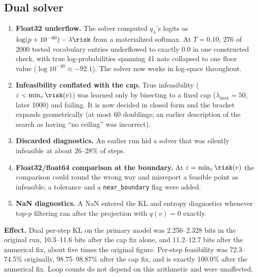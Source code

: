 \subsection*{Dual solver}
\begin{enumerate}[leftmargin=*]
  \item \textbf{Float32 underflow.} The solver computed $q_\lambda$'s logits as $\log(p+10^{-40})-\lambda\risk$ from a materialized softmax. At $T{=}0.10$, 276 of 2000 tested vocabulary entries underflowed to exactly $0.0$ in one constructed check, with true log-probabilities spanning 41 nats collapsed to one floor value ($\log10^{-40}\approx-92.1$). The solver now works in log-space throughout.
  \item \textbf{Infeasibility conflated with the cap.} True infeasibility ($\varepsilon<\min_v\risk(v)$) was learned only by bisecting to a fixed cap ($\lambda_{\max}{=}50$, later 1000) and failing. It is now decided in closed form and the bracket expands geometrically (at most 60 doublings; an earlier description of the search as having ``no ceiling'' was incorrect).
  \item \textbf{Discarded diagnostics.} An earlier run hid a solver that was silently infeasible at about 26--28\% of steps.
  \item \textbf{Float32/float64 comparison at the boundary.} At $\varepsilon=\min_v\risk(v)$ the comparison could round the wrong way and misreport a feasible point as infeasible; a tolerance and a \texttt{near\_\allowbreak{}boundary} flag were added.
  \item \textbf{NaN diagnostics.} A NaN entered the KL and entropy diagnostics whenever top-$p$ filtering ran after the projection with $q(v){=}0$ exactly.
\end{enumerate}
\textbf{Effect.} Dual per-step KL on the primary model was 2.256--2.328 bits in the original run, 10.3--11.6 bits after the cap fix alone, and 11.2--12.7 bits after the numerical fix, about five times the original figure. Per-step feasibility was 72.3--74.5\% originally, 98.75--98.87\% after the cap fix, and is exactly 100.0\% after the numerical fix. Loop counts do not depend on this arithmetic and were unaffected.


